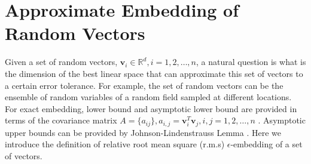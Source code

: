 \documentclass[11pt]{amsart}
\newcommand{\bv}{\mathbf{v}}
\begin{document}
%




\section{Approximate Embedding of Random Vectors}
\label{sec:embedding}
Given a set of random vectors, $\bv_i \in \mathbb{R}^d, i =1, 2, \ldots, n$, a natural question is what is the dimension of the best linear space that can approximate this set of vectors to a certain error tolerance. For example, the set of random vectors can be the ensemble of random variables of a random field sampled at different locations. For exact embedding, lower bound and asymptotic lower bound are provided in terms of the covariance matrix $A=\{a_{ij}\}, a_{i,j}=\bv_i^T\bv_j, i,j=1, 2, \ldots, n$ \cite{alon2003problems}. Asymptotic upper bounds can be provided by Johnson-Lindenstrauss Lemma \cite{johnson1984extensions}. Here we introduce the definition of relative root mean square (r.m.s) $\epsilon$-embedding of a set of vectors. 
\end{document}

